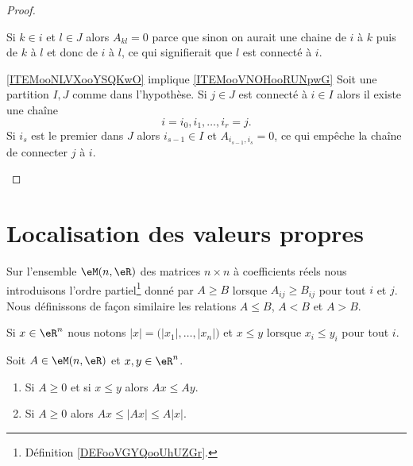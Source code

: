 \begin{proof}
\begin{subproof}
            Si \( k\in i\) et \( l\in J\) alors \( A_{kl}=0\) parce que sinon on aurait une chaine de \( i\) à \( k\) puis de \( k\) à \( l\) et donc de \( i\) à \( l\), ce qui signifierait que \( l\) est connecté à \( i\).

        \item[\ref{ITEMooNLVXooYSQKwO} implique \ref{ITEMooVNOHooRUNpwG}]
            Soit une partition \( I,J\) comme dans l'hypothèse. Si \( j\in J\) est connecté à \( i\in I\) alors il existe une chaîne
            \begin{equation}
                i=i_0,i_1,\ldots, i_r=j.
            \end{equation}
            Si \( i_s\) est le premier dans \( J\) alors \( i_{s-1}\in I\) et \( A_{i_{s-1},i_s}=0\), ce qui empêche la chaîne de connecter \( j\) à \( i\).
    \end{subproof}
\end{proof}

\section{Localisation des valeurs propres}

Sur l'ensemble \( \eM(n,\eR)\) des matrices \( n\times n\) à coefficients réels nous introduisons l'ordre partiel\footnote{Définition \ref{DEFooVGYQooUhUZGr}.} donné par \( A\geq B\) lorsque \( A_{ij}\geq B_{ij}\) pour tout \( i\) et \( j\). Nous définissons de façon similaire les relations \( A\leq B\), \( A<B\) et \( A>B\).

Si \( x\in \eR^n\) nous notons \( | x |=\big( | x_1 |,\ldots, | x_n | \big)\) et \( x\leq y\) lorsque \( x_i\leq y_i\) pour tout \( i\).

\begin{proposition}     \label{PROPooGVRVooZEvKcn}
    Soit \( A\in \eM(n,\eR)\) et \( x,y\in \eR^n\).
    \begin{enumerate}
        \item       \label{ITEMooXQOPooPVLjFh}
            Si \( A\geq 0\) et si \( x\leq y\) alors \( Ax\leq Ay\).
        \item       \label{ITEMooQLCJooKIbws}
            Si \( A\geq 0\) alors \( Ax\leq | Ax |\leq A| x |\).
    \end{enumerate}
\end{proposition}

